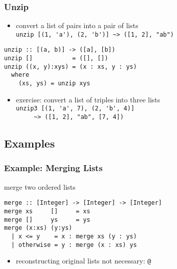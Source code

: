 \documentclass[dvipsnames]{beamer}
\theoremstyle{plain}
\begin{document}
\begin{frame}[fragile]
  \frametitle{Unzip}

  \begin{itemize}
    \item convert a list of pairs into a pair of lists\\
      \lstinline[style=exclamfix]|unzip [(1, 'a'), (2, 'b')] ~> ([1, 2], "ab")|
  \end{itemize}

  \begin{exampleblock}{}
    \begin{lstlisting}[deletekeywords={unzip}]
unzip :: [(a, b)] -> ([a], [b])
unzip []           = ([], [])
unzip ((x, y):xys) = (x : xs, y : ys)
  where
    (xs, ys) = unzip xys
    \end{lstlisting}
  \end{exampleblock}

  \pause
  \begin{itemize}
    \item exercise: convert a list of triples into three lists\\
      \lstinline[style=exclamfix]|unzip3 [(1, 'a', 7), (2, 'b', 4)]|\\
      \lstinline[style=exclamfix]|     ~> ([1, 2], "ab", [7, 4])|
  \end{itemize}
\end{frame}

\subsection{Examples}

\begin{frame}[fragile]
  \frametitle{Example: Merging Lists}

  \begin{exampleblock}{merge two ordered lists}
    \begin{lstlisting}
merge :: [Integer] -> [Integer] -> [Integer]
merge xs     []     = xs
merge []     ys     = ys
merge (x:xs) (y:ys)
  | x <= y    = x : merge xs (y : ys)
  | otherwise = y : merge (x : xs) ys
    \end{lstlisting}
  \end{exampleblock}

  \begin{itemize}
    \item reconstructing original lists not necessary: \lstinline|@|
  \end{itemize}
\end{frame}
\end{document}
